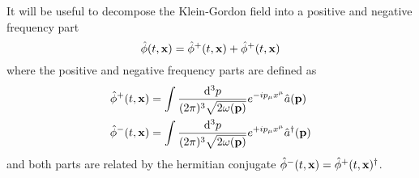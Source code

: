 \begin{definition}
	It will be useful to decompose the Klein-Gordon field into a positive and negative frequency part
	\begin{equation}
		\hat\phi(t,\vb{x})
		=
		\hat\phi^+(t,\vb{x})
		+
		\hat\phi^+(t,\vb{x})
	\end{equation}
	where the positive and negative frequency parts are defined as~\cite[p.~26]{Peskin1995}
	\begin{align}
		\hat\phi^+(t,\vb{x})
		&=
		\int\frac{\dd[3]{p}}{(2\pi)^3\sqrt{2\omega(\vb{p})}}
		e^{-ip_\mu x^\mu}
		\hat{a}(\vb{p})
		\\
		\hat\phi^-(t,\vb{x})
		&=
		\int\frac{\dd[3]{p}}{(2\pi)^3\sqrt{2\omega(\vb{p})}}
		e^{+ip_\mu x^\mu}
		\hat{a}^\dagger(\vb{p})
	\end{align}
	and both parts are related by the hermitian conjugate $\hat\phi^-(t,\vb{x})=\hat\phi^+(t,\vb{x})^\dagger$.
\end{definition}
